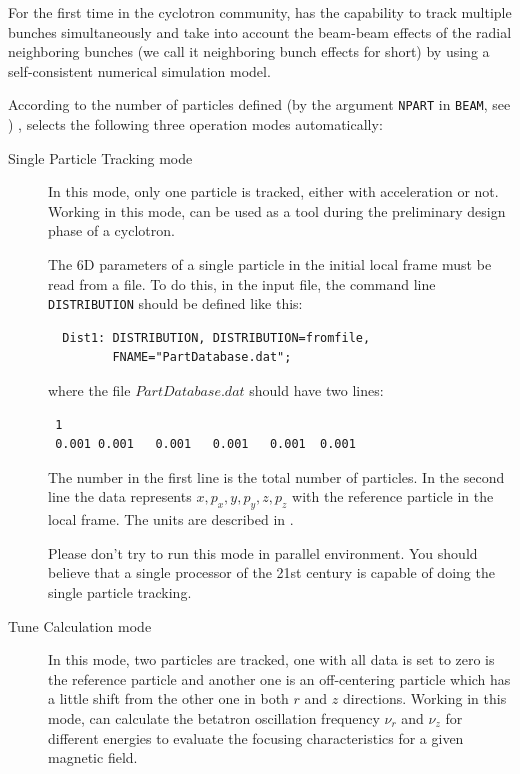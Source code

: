 For the first time in the cyclotron community, \opalcycl has the capability to track multiple bunches simultaneously
and take into account the beam-beam effects of the radial neighboring bunches (we call it neighboring bunch effects for short)
by using a self-consistent numerical simulation model.

According to the number of particles defined (by the argument \texttt{NPART} in \texttt{BEAM}, see ) ,
\opalcycl selects the following three operation modes automatically:

\begin{description}

\item[Single Particle Tracking mode]

  In this mode, only one particle is tracked, either with acceleration or not.  Working in this mode, \opalcycl
  can be used as a tool during the preliminary design phase of a cyclotron.

  The 6D parameters of a single particle in the initial local frame must be read from a file. To do this, in the \opal input file,
  the command line \texttt{DISTRIBUTION}  should be defined like this:
\begin{verbatim}
  Dist1: DISTRIBUTION, DISTRIBUTION=fromfile,
         FNAME="PartDatabase.dat";
\end{verbatim}
 where the file $PartDatabase.dat$ should have two lines:
\begin{verbatim}
 1
 0.001 0.001   0.001   0.001   0.001  0.001
\end{verbatim}
The number in the first line is the total number of particles.
In the second line the data represents $x, p_x, y,$$ p_y, z, p_z$ with the reference particle
in the local frame. The units are described in .

Please don't try to run this mode in parallel environment. You should believe that a single processor of the 21st century is capable of doing
the single particle tracking.

\item[Tune Calculation mode]

  In this mode, two particles are tracked, one with all data is set to zero is the reference particle and another one is an off-centering particle
  which has a little shift from the other one in both $r$ and $z$ directions. Working in this mode, \opalcycl can
  calculate the betatron oscillation frequency $\nu_r$ and $\nu_z$ for different energies to evaluate the focusing characteristics
  for a given magnetic field.


\end{description}
